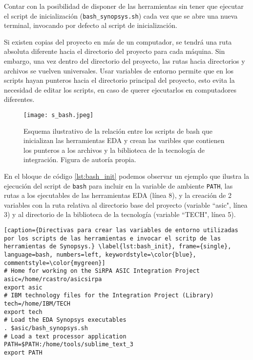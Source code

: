 Contar con la posibilidad de disponer de las herramientas sin tener que ejecutar el script de inicialización (\texttt{bash\_synopsys.sh}) cada vez que se abre una nueva terminal, invocando por defecto al script de inicialización.

Si existen copias del proyecto en más de un computador, se tendrá una ruta absoluta diferente hacia el directorio del proyecto para cada máquina. Sin embargo, una vez dentro del directorio del proyecto, las rutas hacia directorios y archivos se vuelven universales. Usar variables de entorno permite que en los scripts hayan punteros hacia el directorio principal del proyecto, esto evita la necesidad de editar los scripts, en caso de querer ejecutarlos en computadores diferentes.


\begin{figure}[h]
\texttt{[image: s\_bash.jpeg]}
\centering
\caption{Esquema ilustrativo de la relación entre los scripts de bash que inicializan las herramientas EDA y crean las varibles que contienen los punteros a los archivos y la biblioteca de la tecnología de integración. Figura de autoría propia.}
\label{bash_syn}
\end{figure}

En el bloque de código \ref{lst:bash_init} podemos observar un ejemplo que ilustra la ejecución del script de \texttt{bash} para incluir en la variable de ambiente \texttt{PATH}, las rutas a los ejecutables de las herramientas EDA (línea 8), y la creación de 2 variables con la ruta relativa al directorio base del proyecto (variable ``asic", línea 3) y al directorio de la biblioteca de la tecnología (variable ``TECH", línea 5).\\

\newpage
{}

\begin{lstlisting}[caption={Directivas para crear las variables de entorno utilizadas por los scripts de las herramientas e invocar el scritp de las herramientas de Synopsys.} \label{lst:bash_init}, frame={single}, language=bash, numbers=left, keywordstyle=\color{blue}, commentstyle=\color{mygreen}]
# Home for working on the SiRPA ASIC Integration Project
asic=/home/rcastro/asicsirpa
export asic
# IBM technology files for the Integration Project (Library)
tech=/home/IBM/TECH
export tech
# Load the EDA Synopsys executables
. $asic/bash_synopsys.sh
# Load a text processor application
PATH=$PATH:/home/tools/sublime_text_3
export PATH
\end{lstlisting}


